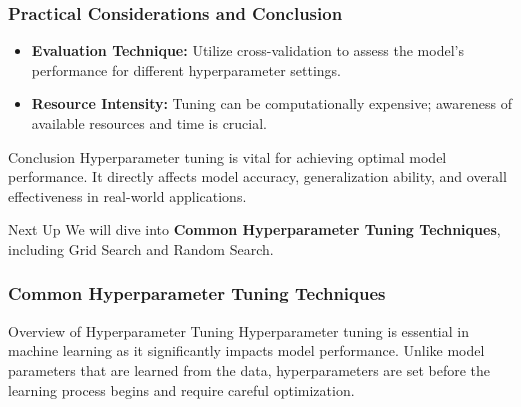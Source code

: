 \documentclass[aspectratio=169]{beamer}
\begin{document}
\begin{frame}[fragile]
    \frametitle{Practical Considerations and Conclusion}
    \begin{itemize}
        \item \textbf{Evaluation Technique:} Utilize cross-validation to assess the model's performance for different hyperparameter settings.
        
        \item \textbf{Resource Intensity:} Tuning can be computationally expensive; awareness of available resources and time is crucial.
    \end{itemize}
    
    \begin{block}{Conclusion}
        Hyperparameter tuning is vital for achieving optimal model performance. It directly affects model accuracy, generalization ability, and overall effectiveness in real-world applications.
    \end{block}
    
    \begin{block}{Next Up}
        We will dive into \textbf{Common Hyperparameter Tuning Techniques}, including Grid Search and Random Search.
    \end{block}
\end{frame}

\begin{frame}[fragile]
    \frametitle{Common Hyperparameter Tuning Techniques}
    \begin{block}{Overview of Hyperparameter Tuning}
        Hyperparameter tuning is essential in machine learning as it significantly impacts model performance. Unlike model parameters that are learned from the data, hyperparameters are set before the learning process begins and require careful optimization.
    \end{block}
\end{frame}
\end{document}
